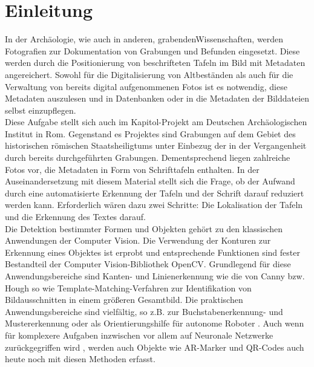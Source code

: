 \section{Einleitung}


In der Archäologie, wie auch in anderen, \glqq grabenden\grqq  Wissenschaften, werden Fotografien zur Dokumentation von Grabungen und Befunden eingesetzt. Diese werden durch die Positionierung von beschrifteten Tafeln im Bild mit Metadaten angereichert. Sowohl für die Digitalisierung von Altbeständen als auch für die Verwaltung von bereits digital aufgenommenen Fotos ist es notwendig, diese Metadaten auszulesen und in Datenbanken oder in die Metadaten der Bilddateien selbst einzupflegen.\\
Diese Aufgabe stellt sich auch im Kapitol-Projekt am Deutschen Archäologischen Institut in Rom. Gegenstand es Projektes sind Grabungen auf dem Gebiet des historischen römischen Staatsheiligtums unter Einbezug der in der Vergangenheit durch bereits durchgeführten Grabungen. Dementsprechend liegen zahlreiche Fotos vor, die Metadaten in Form von Schrifttafeln enthalten. In der Auseinandersetzung mit diesem Material stellt sich die Frage, ob der Aufwand durch eine automatisierte Erkennung der Tafeln und der Schrift darauf reduziert werden kann. Erforderlich wären dazu zwei Schritte: Die Lokalisation der Tafeln und die Erkennung des Textes darauf.\\
Die Detektion bestimmter Formen und Objekten gehört zu den klassischen Anwendungen der Computer Vision. Die Verwendung der Konturen zur Erkennung eines Objektes ist erprobt und entsprechende Funktionen sind fester Bestandteil der Computer Vision-Bibliothek OpenCV. Grundlegend für diese Anwendungsbereiche sind Kanten- und Linienerkennung wie die von Canny\cite{cannyedge} bzw. Hough\cite{houghpatent} so wie Template-Matching-Verfahren\cite{opencvtemplatematching} zur Identifikation von Bildausschnitten in einem größeren Gesamtbild. Die praktischen Anwendungsbereiche sind vielfältig, so z.B. zur Buchstabenerkennung- und Mustererkennung\cite{adamek} oder als Orientierungshilfe für autonome Roboter \cite{shaw}. Auch wenn für komplexere Aufgaben inzwischen vor allem auf Neuronale Netzwerke zurückgegriffen wird \cite{introduction}, werden auch Objekte wie AR-Marker und QR-Codes auch heute noch mit diesen Methoden erfasst\cite{armarker}.\\
